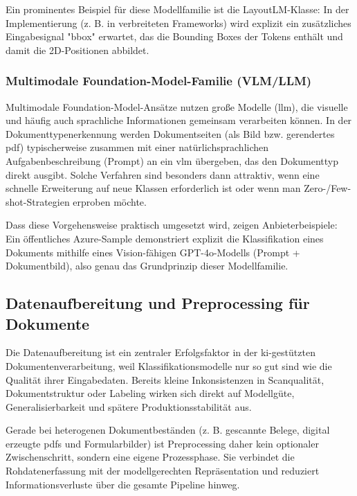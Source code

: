 Ein prominentes Beispiel für diese Modellfamilie ist die LayoutLM-Klasse: In der Implementierung (z. B. in verbreiteten Frameworks) wird explizit ein zusätzliches Eingabesignal "bbox" erwartet, das die Bounding Boxes der Tokens enthält und damit die 2D-Positionen abbildet. \cite{huggingface_layoutlm}

\subsubsection{Multimodale Foundation-Model-Familie (VLM/LLM)}

Multimodale Foundation-Model-Ansätze nutzen große Modelle (\acrshort{llm}), die visuelle und häufig auch sprachliche Informationen gemeinsam verarbeiten können. 
In der Dokumenttypenerkennung werden Dokumentseiten (als Bild bzw. gerendertes \acrshort{pdf}) typischerweise zusammen mit einer natürlichsprachlichen Aufgabenbeschreibung (Prompt) an ein \acrshort{vlm} übergeben, das den Dokumenttyp direkt ausgibt. 
Solche Verfahren sind besonders dann attraktiv, wenn eine schnelle Erweiterung auf neue Klassen erforderlich ist oder wenn man Zero-/Few-shot-Strategien erproben möchte. \cite{azuresamples_docclass_gptvision}

Dass diese Vorgehensweise praktisch umgesetzt wird, zeigen Anbieterbeispiele: Ein öffentliches Azure-Sample demonstriert explizit die Klassifikation eines Dokuments mithilfe eines Vision-fähigen GPT-4o-Modells (Prompt + Dokumentbild), 
also genau das Grundprinzip dieser Modellfamilie. \cite{azuresamples_docclass_gptvision}

\subsection{Datenaufbereitung und Preprocessing für Dokumente}

Die Datenaufbereitung ist ein zentraler Erfolgsfaktor in der \gls{ki}-gestützten Dokumentenverarbeitung, weil Klassifikationsmodelle nur so gut sind wie die Qualität ihrer Eingabedaten. 
Bereits kleine Inkonsistenzen in Scanqualität, Dokumentstruktur oder Labeling wirken sich direkt auf Modellgüte, Generalisierbarkeit und spätere Produktionsstabilität aus. \cite{shaip2025dokumentenklassifizierung}

Gerade bei heterogenen Dokumentbeständen (z. B. gescannte Belege, digital erzeugte \acrshort{pdf}s und Formularbilder) ist Preprocessing daher kein optionaler Zwischenschritt, sondern eine eigene Prozessphase. 
Sie verbindet die Rohdatenerfassung mit der modellgerechten Repräsentation und reduziert Informationsverluste über die gesamte Pipeline hinweg. \cite{shaip2025dokumentenklassifizierung}

